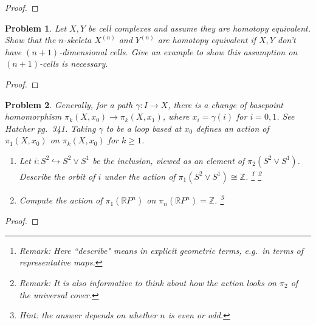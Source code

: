 \documentclass[11pt]{article}
\newtheorem{problem}{Problem}
\begin{document}
\begin{proof}

\end{proof} 


\pagebreak 

\begin{problem}
Let $X,Y$ be cell complexes and assume they are homotopy equivalent. Show that the $n$-skeleta $X^{(n)}$ and $Y^{(n)}$ are homotopy equivalent if $X,Y$ don't have $(n+1)$-dimensional cells. Give an example to show this assumption on $(n+1)$-cells is necessary. 
\end{problem}

\begin{proof}

\end{proof} 

\pagebreak 

\begin{problem}
Generally, for a path $\gamma:I\to X$, there is a change of basepoint homomorphism $\pi_k(X,x_0)\to \pi_k(X,x_1)$, where $x_i=\gamma(i)$ for $i=0,1$. See Hatcher pg.\ 341. Taking $\gamma$ to be a loop based at $x_0$ defines an action of $\pi_1(X,x_0)$ on $\pi_k(X,x_0)$ for $k\ge1$. 
\begin{enumerate}
\item[(a)] Let $i:S^2\hookrightarrow S^2\vee S^1$ be the inclusion, viewed as an element of $\pi_2(S^2\vee S^1)$. Describe the orbit of $i$ under the action of $\pi_1(S^2\vee S^1)\cong\mathbb Z$. \footnote{Remark: Here ``describe" means in explicit geometric terms, e.g.\ in terms of representative maps.} \footnote{Remark: It is also informative to think about how the action looks on $\pi_2$ of the universal cover.}
\item[(b)] Compute the action of $\pi_1(\mathbb RP^n)$ on $\pi_n(\mathbb RP^n)=\mathbb Z$. 
\footnote{Hint: the answer depends on whether $n$ is even or odd.}
\end{enumerate} 
\end{problem}

\begin{proof}

\end{proof}
\end{document}
